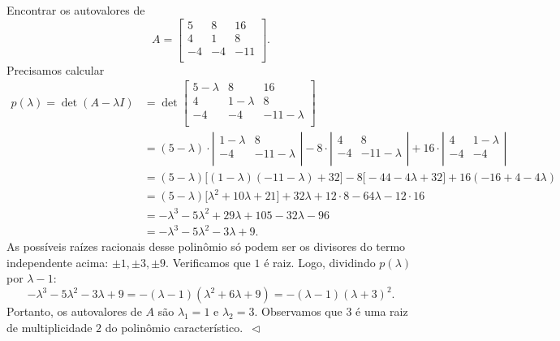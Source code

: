 \begin{ex}\label{3x3}
	Encontrar os autovalores de
	\begin{equation}
	A =
	\left[
	\begin{array}{ccc}
	5 & 8 & 16 \\
	4 & 1 & 8 \\
	-4 & -4 & -11 \\
	\end{array}
	\right].
	\end{equation} Precisamos calcular
        \begin{align*}
	p(\lambda) = \det (A-\lambda I) & = \det
	\left[
	\begin{array}{ccc}
	5-\lambda & 8 & 16 \\
	4 & 1-\lambda & 8 \\
	-4 & -4 & -11-\lambda \\
	\end{array}
	\right] \\
	& = (5-\lambda) \cdot
	\left|
	\begin{array}{cc}
	1-\lambda & 8 \\
	-4 & -11-\lambda \\
	\end{array}
	\right| -8 \cdot
	\left|
	\begin{array}{cc}
	4 & 8 \\
	-4 & -11-\lambda \\
	\end{array}
	\right| + 16 \cdot
	\left|
	\begin{array}{cc}
	4 & 1-\lambda \\
	-4 & -4 \\
	\end{array}
	\right| \\
	& = (5-\lambda)\big[ (1-\lambda)(-11-\lambda) +32 \big] - 8 \big[ -44-4\lambda +32 \big] + 16 (-16 + 4 -4\lambda) \\
	& = (5-\lambda)\big[ \lambda^2 + 10 \lambda + 21 \big] + 32 \lambda + 12 \cdot 8 - 64\lambda - 12\cdot 16 \\
	& = -\lambda^3 - 5 \lambda^2 + 29 \lambda + 105  - 32 \lambda - 96 \\
	& = -\lambda^3 - 5 \lambda^2 - 3 \lambda + 9.
          \end{align*}
          As possíveis raízes racionais desse polinômio só podem ser os divisores do termo independente acima: $\pm 1, \pm 3, \pm9$. Verificamos que $1$ é raiz. Logo, dividindo $p(\lambda)$ por $\lambda - 1$:
	\begin{equation}
	-\lambda^3 - 5 \lambda^2 - 3 \lambda + 9 = -(\lambda - 1)(\lambda^2 + 6\lambda + 9) = -(\lambda - 1)(\lambda + 3)^2.
	\end{equation} Portanto, os autovalores de $A$ são $\lambda_1 = 1$ e $\lambda_2 = 3$. Observamos que $3$ é uma raiz de multiplicidade $2$ do polinômio característico. $\, \lhd$
\end{ex}

